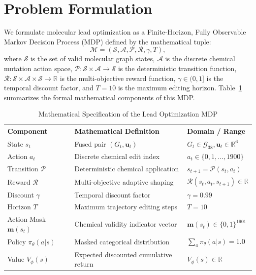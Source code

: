 \documentclass{ieeeaccess}
\begin{document}
\section{Problem Formulation}
\label{sec:problem}
We formulate molecular lead optimization as a Finite-Horizon, Fully Observable Markov Decision Process (MDP) defined by the mathematical tuple:
\begin{equation}
\mathcal{M} = \left(\mathcal{S}, \mathcal{A}, \mathcal{P}, \mathcal{R}, \gamma, T\right),
\label{eq:mdp_tuple}
\end{equation}
where $\mathcal{S}$ is the set of valid molecular graph states, $\mathcal{A}$ is the discrete chemical mutation action space, $\mathcal{P}: \mathcal{S} \times \mathcal{A} \to \mathcal{S}$ is the deterministic transition function, $\mathcal{R}: \mathcal{S} \times \mathcal{A} \times \mathcal{S} \to \mathbb{R}$ is the multi-objective reward function, $\gamma \in (0, 1]$ is the temporal discount factor, and $T = 10$ is the maximum editing horizon. Table~\ref{tab:mdp_summary} summarizes the formal mathematical components of this MDP.

\begin{table}[!tbp]
\caption{Mathematical Specification of the Lead Optimization MDP}
\label{tab:mdp_summary}
\centering
\footnotesize
\begin{tabularx}{\columnwidth}{l X l}
\toprule
\textbf{Component} & \textbf{Mathematical Definition} & \textbf{Domain / Range}\\
\midrule
State $s_t$ & Fused pair $(G_t, \mathbf{u}_t)$ & $G_t \in \mathcal{G}_{38}, \mathbf{u}_t \in \mathbb{R}^6$\\
Action $a_t$ & Discrete chemical edit index & $a_t \in \{0, 1, \dots, 1900\}$\\
Transition $\mathcal{P}$ & Deterministic chemical application & $s_{t+1} = \mathcal{P}(s_t, a_t)$\\
Reward $\mathcal{R}$ & Multi-objective adaptive shaping & $\mathcal{R}(s_t, a_t, s_{t+1}) \in \mathbb{R}$\\
Discount $\gamma$ & Temporal discount factor & $\gamma = 0.99$\\
Horizon $T$ & Maximum trajectory editing steps & $T = 10$\\
Action Mask $\mathbf{m}(s_t)$ & Chemical validity indicator vector & $\mathbf{m}(s_t) \in \{0, 1\}^{1901}$\\
Policy $\pi_\theta(a|s)$ & Masked categorical distribution & $\sum_a \pi_\theta(a|s) = 1.0$\\
Value $V_\phi(s)$ & Expected discounted cumulative return & $V_\phi(s) \in \mathbb{R}$\\
\bottomrule
\end{tabularx}
\end{table}
\end{document}

